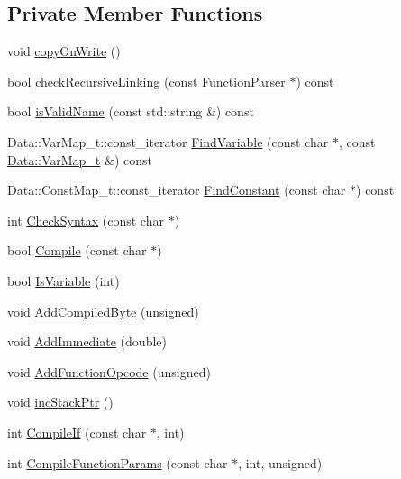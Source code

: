 \subsection*{Private Member Functions}
\begin{DoxyCompactItemize}
\item 
void \hyperlink{class_function_parser_a0af0f9ad348adf7df57fa630eddf8e47}{copy\+On\+Write} ()
\item 
bool \hyperlink{class_function_parser_abfc0c76a7006ba7b0e45e21bcd6f83cd}{check\+Recursive\+Linking} (const \hyperlink{class_function_parser}{Function\+Parser} $\ast$) const
\item 
bool \hyperlink{class_function_parser_a79441f19176e18e88155f1101108dbe6}{is\+Valid\+Name} (const std\+::string \&) const
\item 
Data\+::\+Var\+Map\+\_\+t\+::const\+\_\+iterator \hyperlink{class_function_parser_a1c1ea54f04c1dfb8d8609240ba9f5f40}{Find\+Variable} (const char $\ast$, const \hyperlink{struct_function_parser_1_1_data_a02f3fbca3164d0e498312b418258ea84}{Data\+::\+Var\+Map\+\_\+t} \&) const
\item 
Data\+::\+Const\+Map\+\_\+t\+::const\+\_\+iterator \hyperlink{class_function_parser_a305fdcea81a498567dc92010338cee7c}{Find\+Constant} (const char $\ast$) const
\item 
int \hyperlink{class_function_parser_a3895fdbb2f21fc7facebcd4a3c2399f7}{Check\+Syntax} (const char $\ast$)
\item 
bool \hyperlink{class_function_parser_aa136efc410ad6a9c2992fb6e1c9b057c}{Compile} (const char $\ast$)
\item 
bool \hyperlink{class_function_parser_afd635d05f1b4d3ef6f09b75dd92926e5}{Is\+Variable} (int)
\item 
void \hyperlink{class_function_parser_a714d401cb9368826a87b7f15575de2a3}{Add\+Compiled\+Byte} (unsigned)
\item 
void \hyperlink{class_function_parser_a59cf4b93d74e0572386742603977f886}{Add\+Immediate} (double)
\item 
void \hyperlink{class_function_parser_aadefd3517f92e066d9926a1998e9fe2f}{Add\+Function\+Opcode} (unsigned)
\item 
void \hyperlink{class_function_parser_a2ba1bb889a7035da4a7639d6b7ce53c6}{inc\+Stack\+Ptr} ()
\item 
int \hyperlink{class_function_parser_a9978dd583ee328a7f71a6075a3c5f97c}{Compile\+If} (const char $\ast$, int)
\item 
int \hyperlink{class_function_parser_a22e24efb5ef28aa34025bf49fe505010}{Compile\+Function\+Params} (const char $\ast$, int, unsigned)

\end{DoxyCompactItemize}
